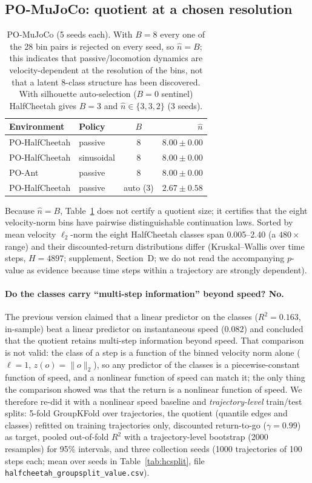 \documentclass[10pt]{article}
\begin{document}
\subsection{PO-MuJoCo: quotient at a chosen resolution}
\label{sec:mujoco}

\begin{table}[h]
\centering
\caption{PO-MuJoCo (5 seeds each).  With $B=8$ every one of the 28 bin
  pairs is rejected on every seed, so $\hat n=B$; this indicates that
  passive/locomotion dynamics are velocity-dependent at the resolution of the
  bins, not that a latent 8-class structure has been discovered.  With
  silhouette auto-selection ($B=0$ sentinel) HalfCheetah gives $B=3$ and
  $\hat n\in\{3,3,2\}$ (3 seeds).}
\label{tab:mujoco}
\begin{tabular}{llcr}
\toprule
Environment & Policy & $B$ & $\hat n$ \\
\midrule
PO-HalfCheetah & passive     & 8    & $8.00\pm0.00$ \\
PO-HalfCheetah & sinusoidal  & 8    & $8.00\pm0.00$ \\
PO-Ant         & passive     & 8    & $8.00\pm0.00$ \\
PO-HalfCheetah & passive     & auto (3) & $2.67\pm0.58$ \\
\bottomrule
\end{tabular}
\end{table}

Because $\hat n=B$, Table~\ref{tab:mujoco} does not certify a quotient
size; it certifies that the eight velocity-norm bins have pairwise
distinguishable continuation laws.  Sorted by mean velocity $\ell_2$-norm the
eight HalfCheetah classes span 0.005--2.40 (a $480\times$ range) and their
discounted-return distributions differ (Kruskal--Wallis over time steps,
$H=4897$; supplement, Section~D; we do not read the accompanying $p$-value as
evidence because time steps within a trajectory are strongly dependent).

\paragraph{Do the classes carry ``multi-step information'' beyond speed?  No.}
The previous version claimed that a linear predictor on the classes
($R^2=0.163$, in-sample) beat a linear predictor on instantaneous speed
($0.082$) and concluded that the quotient retains multi-step information
beyond speed.  That comparison is not valid: the class of a step is a function
of the binned velocity norm alone ($\ell=1$, $z(o)=\|o\|_2$), so any predictor
of the classes is a piecewise-constant function of speed, and a nonlinear
function of speed can match it; the only thing the comparison showed was that
the return is a nonlinear function of speed.  We therefore re-did it with a
nonlinear speed baseline and \emph{trajectory-level} train/test splits: 5-fold
GroupKFold over trajectories, the quotient (quantile edges and classes) refitted on
training trajectories only, discounted return-to-go ($\gamma=0.99$) as target,
pooled out-of-fold $R^2$ with a trajectory-level bootstrap (2000 resamples) for
95\% intervals, and three collection seeds (1000 trajectories of 100 steps each;
mean over seeds in Table~\ref{tab:hcsplit}, file
\texttt{halfcheetah\_groupsplit\_value.csv}).
\end{document}
